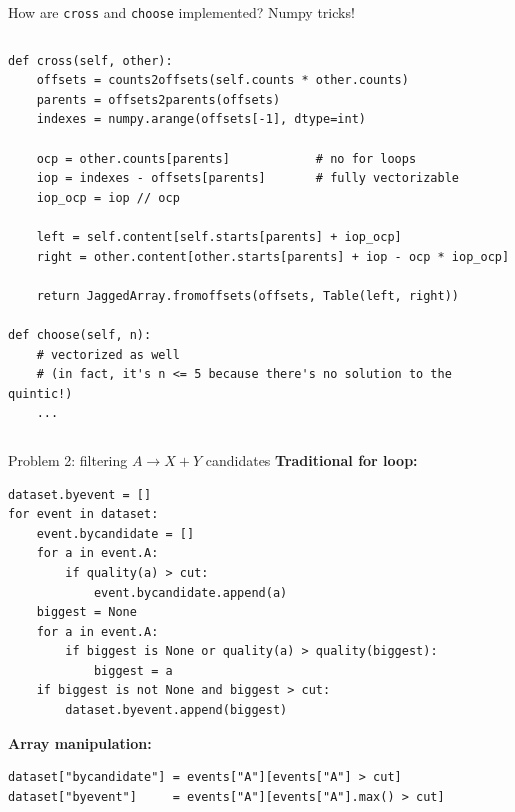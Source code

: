 \documentclass[aspectratio=169]{beamer}
\begin{document}
\begin{frame}[fragile]{How are {\tt cross} and {\tt choose} implemented? Numpy tricks!}
\begin{columns}
\small
\begin{verbatim}
def cross(self, other):
    offsets = counts2offsets(self.counts * other.counts)
    parents = offsets2parents(offsets)
    indexes = numpy.arange(offsets[-1], dtype=int)

    ocp = other.counts[parents]            # no for loops
    iop = indexes - offsets[parents]       # fully vectorizable
    iop_ocp = iop // ocp

    left = self.content[self.starts[parents] + iop_ocp]
    right = other.content[other.starts[parents] + iop - ocp * iop_ocp]

    return JaggedArray.fromoffsets(offsets, Table(left, right))

def choose(self, n):
    # vectorized as well
    # (in fact, it's n <= 5 because there's no solution to the quintic!)
    ...
\end{verbatim}
\end{columns}
\end{frame}

\begin{frame}[fragile]{Problem 2: filtering $A \to X + Y$ candidates}
\vspace{0.4 cm}
{\bf Traditional for loop:} 
\small
\begin{verbatim}
dataset.byevent = []
for event in dataset:
    event.bycandidate = []
    for a in event.A:
        if quality(a) > cut:
            event.bycandidate.append(a)
    biggest = None
    for a in event.A:
        if biggest is None or quality(a) > quality(biggest):
            biggest = a
    if biggest is not None and biggest > cut:
        dataset.byevent.append(biggest)
\end{verbatim}
\normalsize

\vspace{0.1 cm}
{\bf Array manipulation:} 
\small
\begin{verbatim}
dataset["bycandidate"] = events["A"][events["A"] > cut]
dataset["byevent"]     = events["A"][events["A"].max() > cut]
\end{verbatim}
\end{frame}
\end{document}
